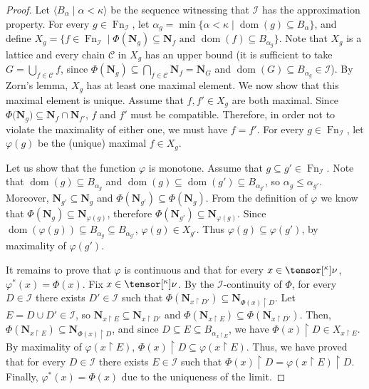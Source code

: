\documentclass{amsart}
\numberwithin{equation}{section}
\newcommand{\C}{\mathcal{C}}
\newcommand{\I}{\mathcal{I}}
\newcommand{\pre}[2]{\tensor[^{#1}]{#2}{}}
\newcommand{\seq}[2]{\langle #1 \mid #2 \rangle}
\newcommand{\Nbhd}{\boldsymbol{N}}
\newcommand{\1}{\mathbf{I}}
\newcommand{\2}{\mathbf{II}}
\renewcommand{\a}{\alpha}
\renewcommand{\k}{\kappa}
\renewcommand{\phi}{\varphi}
\DeclareMathOperator{\dom}{dom}
\DeclareMathOperator{\Fn}{Fn}
\newcommand{\clopen}[1]{\Nbhd_{#1}}
\theoremstyle{definition}
\theoremstyle{remark}
\begin{document}
\begin{proof} 
Let \(\seq{B_\a}{\a<\k}\) be the sequence witnessing that \(\I\) has the approximation property. 
For every \(g \in \Fn_\I\), let \(\a_g=\min \{\a<\k \mid \dom(g)\subseteq B_{\a}\}\), and  define \(X_g=\{f \in \Fn_\I \mid \Phi\left(\Nbhd_g \right) \subseteq \Nbhd_f \text{ and } \dom(f)\subseteq B_{\a_g}\}\). Note that \(X_g\) is 
a lattice and every chain \(\C\) in \(X_g\) has an upper bound (it is sufficient to take \(G=\bigcup_{f \in \C}f\), since $\Phi\left(\Nbhd_g \right)\subseteq\bigcap_{f \in \C}\Nbhd_f=\Nbhd_G$ and \(\dom(G) \subseteq B_{\a_g}\in \I\)).
By Zorn’s lemma, \(X_g\) has at least one maximal element. We now show that this maximal element is unique. Assume that \(f,f'\in X_g\) are both maximal. Since \(\Phi\bigl(\Nbhd_g\bigr) \subseteq \clopen{f} \cap \clopen{f'}\),  \(f\) and \(f'\) must be compatible. Therefore, in order not to violate the maximality of either one, we must have \(f = f'\).
For every \(g \in \Fn_\I\),  let $\varphi(g)$ be the (unique) maximal $f \in X_g$.

Let us show that the function $\varphi$ is monotone. Assume that \(g \subseteq g' \in \Fn_\I\). Note that \(\dom(g) \subseteq B_{\a_g}\) and \(\dom(g) \subseteq \dom(g') \subseteq B_{\a_{g'}}\), so \(\a_g \leq \a_{g'}\).
Moreover, $\Nbhd_{g'}\subseteq \Nbhd_{g}$ and \(\Phi(\Nbhd_{g'})\subseteq \Phi(\Nbhd_{g})\). From the definition of $\phi$ we know that \(\Phi(\Nbhd_{g}) \subseteq \Nbhd_{\phi(g)}\), therefore \(\Phi(\Nbhd_{g'}) \subseteq \Nbhd_{\phi(g)}\). Since \(\dom(\phi(g))\subseteq B_{\a_g}\subseteq B_{\a_{g'}}\), \(\phi(g)\in X_{g'}\). Thus \(\phi(g) \subseteq \phi(g')\), by maximality of \(\phi(g')\).

It remains to prove that \(\phi\) is continuous and that for every $x \in \pre{\k}{\nu}$, $\varphi^*(x)=\Phi(x)$. 
Fix \(x \in \pre{\k}{\nu}\). 
By the \(\I\)-continuity of $\Phi$, for every $D \in \I$ there exists $D'\in \I$ such that $\Phi(\Nbhd_{x \restriction D'}) \subseteq \Nbhd_{\Phi(x)\restriction D}$. 
Let $ E= D \cup D' \in \I$, so $\Nbhd_{x \restriction E}\subseteq \Nbhd_{x \restriction D'}$ and $\Phi(\Nbhd_{x \restriction E})\subseteq \Phi(\Nbhd_{x \restriction D'})$. Then,  $\Phi(\Nbhd_{x \restriction E})\subseteq \Nbhd_{\Phi(x)\restriction D}$, and since \(D \subseteq E \subseteq B_{\a_{x\restriction E }}\), we have
\(\Phi(x)\restriction D\in X_{x\restriction E}\). 
By maximality of \(\varphi(x \restriction E)\), $\Phi(x)\restriction D \subseteq \varphi(x\restriction E)$.
Thus, we have proved that for every $D \in \I$ there exists \( E \in \I\) such that $\Phi(x)\restriction D = \varphi(x\restriction E)\restriction D$. Finally, $\varphi^*(x)=\Phi(x)$ due to the uniqueness of the limit.
\end{proof}
\end{document}
